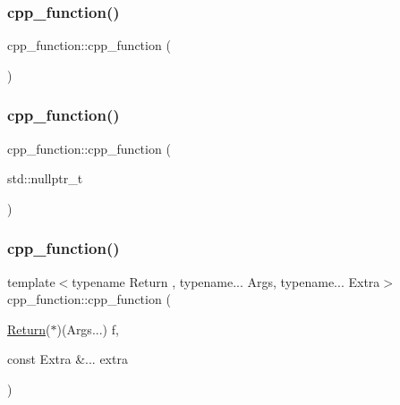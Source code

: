 \subsubsection{\texorpdfstring{cpp\_function()}{cpp\_function()}\hspace{0.1cm}{\footnotesize\ttfamily [1/6]}}
{\footnotesize\ttfamily cpp\+\_\+function\+::cpp\+\_\+function (\begin{DoxyParamCaption}{ }\end{DoxyParamCaption})\hspace{0.3cm}{\ttfamily [inline]}}

\mbox{\label{classcpp__function_a645776419d4d24d2fef4c3339cffe7c3}} 
\subsubsection{\texorpdfstring{cpp\_function()}{cpp\_function()}\hspace{0.1cm}{\footnotesize\ttfamily [2/6]}}
{\footnotesize\ttfamily cpp\+\_\+function\+::cpp\+\_\+function (\begin{DoxyParamCaption}\item[{std\+::nullptr\+\_\+t}]{ }\end{DoxyParamCaption})\hspace{0.3cm}{\ttfamily [inline]}}

\mbox{\label{classcpp__function_adf288fd4fadeaf8e9e142d177fc267da}} 
\subsubsection{\texorpdfstring{cpp\_function()}{cpp\_function()}\hspace{0.1cm}{\footnotesize\ttfamily [3/6]}}
{\footnotesize\ttfamily template$<$typename Return , typename... Args, typename... Extra$>$ \\
cpp\+\_\+function\+::cpp\+\_\+function (\begin{DoxyParamCaption}\item[{\mbox{\hyperlink{_python-ast_8h_abdae7f49d66ce8e500825bb53aa14901}{Return}}($\ast$)(Args...)}]{f,  }\item[{const Extra \&...}]{extra }\end{DoxyParamCaption})\hspace{0.3cm}{\ttfamily [inline]}}



